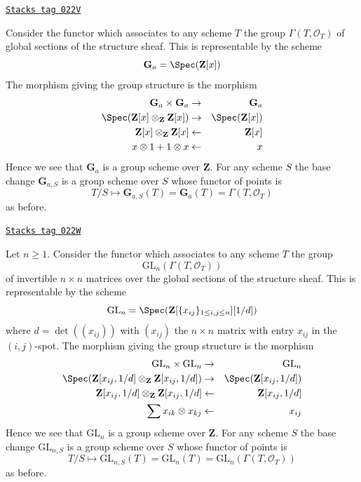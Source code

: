 \begin{example}

\label{groupoids-example-additive-group}
\href{https://stacks.math.columbia.edu/tag/022V}{\texttt{Stacks tag 022V}}

Consider the functor which associates
to any scheme $T$ the group $\Gamma(T, \mathcal{O}_T)$
of global sections of the structure sheaf.
This is representable by the scheme
$$
\mathbf{G}_a = \Spec(\mathbf{Z}[x])
$$
The morphism giving the group structure is the morphism
\begin{eqnarray*}
\mathbf{G}_a \times \mathbf{G}_a & \to & \mathbf{G}_a \\
\Spec(\mathbf{Z}[x] \otimes_{\mathbf{Z}} \mathbf{Z}[x])
& \to &
\Spec(\mathbf{Z}[x]) \\
\mathbf{Z}[x] \otimes_{\mathbf{Z}} \mathbf{Z}[x]
& \leftarrow &
\mathbf{Z}[x] \\
x \otimes 1 + 1 \otimes x & \leftarrow & x
\end{eqnarray*}
Hence we see that $\mathbf{G}_a$ is a group scheme over $\mathbf{Z}$.
For any scheme $S$ the base change $\mathbf{G}_{a, S}$ is a
group scheme over $S$ whose functor of points is
$$
T/S
\longmapsto
\mathbf{G}_{a, S}(T) = \mathbf{G}_a(T) = \Gamma(T, \mathcal{O}_T)
$$
as before.
\end{example}

\begin{example}

\label{groupoids-example-general-linear-group}
\href{https://stacks.math.columbia.edu/tag/022W}{\texttt{Stacks tag 022W}}

Let $n \geq 1$.
Consider the functor which associates
to any scheme $T$ the group
$$
\text{GL}_n(\Gamma(T, \mathcal{O}_T))
$$
of invertible $n \times n$ matrices over
the global sections of the structure sheaf.
This is representable by the scheme
$$
\text{GL}_n = \Spec(\mathbf{Z}[\{x_{ij}\}_{1 \leq i, j \leq n}][1/d])
$$
where $d = \det((x_{ij}))$ with $(x_{ij})$ the $n \times n$ matrix
with entry $x_{ij}$ in the $(i, j)$-spot.
The morphism giving the group structure is the morphism
\begin{eqnarray*}
\text{GL}_n \times \text{GL}_n & \to & \text{GL}_n \\
\Spec(\mathbf{Z}[x_{ij}, 1/d] \otimes_{\mathbf{Z}}
\mathbf{Z}[x_{ij}, 1/d])
& \to &
\Spec(\mathbf{Z}[x_{ij}, 1/d]) \\
\mathbf{Z}[x_{ij}, 1/d] \otimes_{\mathbf{Z}} \mathbf{Z}[x_{ij}, 1/d]
& \leftarrow &
\mathbf{Z}[x_{ij}, 1/d] \\
\sum x_{ik} \otimes x_{kj} & \leftarrow & x_{ij}
\end{eqnarray*}
Hence we see that $\text{GL}_n$ is a group scheme over $\mathbf{Z}$.
For any scheme $S$ the base change $\text{GL}_{n, S}$ is a
group scheme over $S$ whose functor of points is
$$
T/S
\longmapsto
\text{GL}_{n, S}(T) = \text{GL}_n(T) =\text{GL}_n(\Gamma(T, \mathcal{O}_T))
$$
as before.
\end{example}


